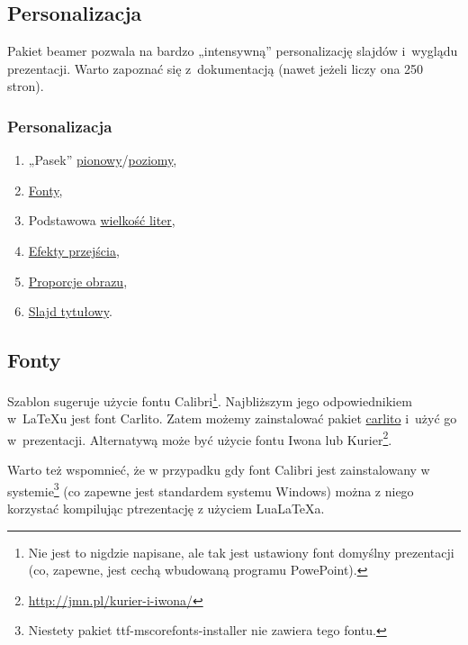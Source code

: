 \subsection{Personalizacja}

Pakiet beamer pozwala na bardzo „intensywną” personalizację slajdów i~wyglądu prezentacji. Warto zapoznać się z~dokumentacją \cite{Beamer} (nawet jeżeli liczy ona 250 stron).

\begin{frame}
 \frametitle<presentation>{Personalizacja}
 \begin{enumerate}
  \item
        „Pasek” \hyperlink{pasekpionowy}{pionowy}/\hyperlink{pasekpoziomy}{poziomy},
  \item
        \hyperlink{fonty}{Fonty},
  \item
        Podstawowa \hyperlink{fontsize}{wielkość liter},
  \item
        \hyperlink{efekty}{Efekty przejścia},
  \item
        \hyperlink{proporcje}{Proporcje obrazu},
  \item
        \hyperlink{tytul}{Slajd tytułowy}.
 \end{enumerate}
\end{frame}

\subsection{Fonty}\label{lab:fonty}

Szablon sugeruje użycie fontu Calibri\footnote{Nie jest to nigdzie napisane, ale tak jest ustawiony font domyślny prezentacji (co, zapewne, jest cechą wbudowaną programu PowePoint).}. Najbliższym jego odpowiednikiem w~\LaTeX{}u jest font Carlito.
Zatem możemy zainstalować pakiet \href{https://www.ctan.org/pkg/carlito}{carlito} i~użyć go w~prezentacji.
Alternatywą może być użycie fontu Iwona lub Kurier\footnote{\url{http://jmn.pl/kurier-i-iwona/}}.

Warto też wspomnieć, że w przypadku gdy font Calibri jest zainstalowany w systemie\footnote{Niestety pakiet ttf-mscorefonts-installer nie zawiera tego fontu.} (co zapewne jest standardem systemu Windows) można z niego korzystać kompilując ptrezentację z użyciem LuaLaTeXa.

